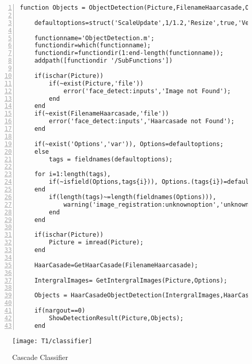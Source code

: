 \begin{lstlisting}[style=Matlab-editor, numbers=left,label={lst:ObjectDetection},captionpos=b, caption={Code \textbf{ObjectDetection.m} }]
	function Objects = ObjectDetection(Picture,FilenameHaarcasade,Options)
	
	defaultoptions=struct('ScaleUpdate',1/1.2,'Resize',true,'Verbose',true);
	
	functionname='ObjectDetection.m';
	functiondir=which(functionname);
	functiondir=functiondir(1:end-length(functionname));
	addpath([functiondir '/SubFunctions'])

	if(ischar(Picture))
		if(~exist(Picture,'file'))
			error('face_detect:inputs','Image not Found');
		end
	end
	if(~exist(FilenameHaarcasade,'file'))
		error('face_detect:inputs','Haarcasade not Found');
	end

	if(~exist('Options','var')), Options=defaultoptions;
	else
		tags = fieldnames(defaultoptions);
		
	for i=1:length(tags),
		if(~isfield(Options,tags{i})), Options.(tags{i})=defaultoptions.(tags{i}); end
	end
		if(length(tags)~=length(fieldnames(Options))),
			warning('image_registration:unknownoption','unknown options found');
		end
	end

	if(ischar(Picture))
		Picture = imread(Picture);
	end

	HaarCasade=GetHaarCasade(FilenameHaarcasade);

	IntergralImages= GetIntergralImages(Picture,Options);
	
	Objects = HaarCasadeObjectDetection(IntergralImages,HaarCasade,Options);

	if(nargout==0)
		ShowDetectionResult(Picture,Objects);
	end
\end{lstlisting}

\begin{figure}[h]
	\centering
	\texttt{[image: T1/classifier]}
	\caption{Cascade Classifier}
	\label{fig:slideT1}
\end{figure}